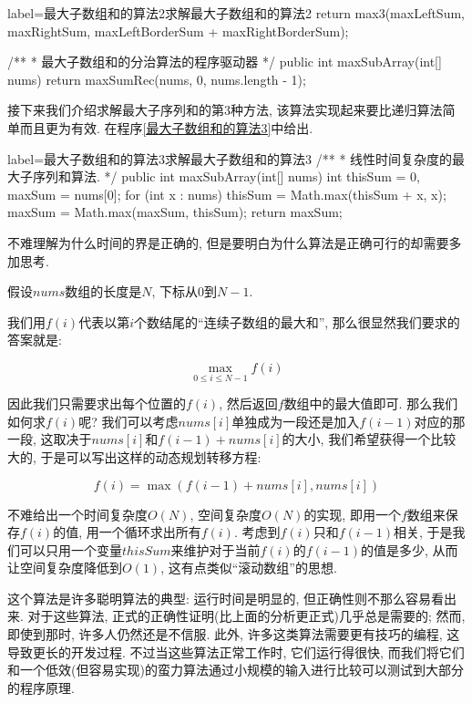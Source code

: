 \documentclass[oneside]{ctexbook}
\begin{document}
{\begin{myjava}{label={最大子数组和的算法2}}{求解最大子数组和的算法2}
{    return max3(maxLeftSum, maxRightSum,
                maxLeftBorderSum + maxRightBorderSum);
}

/**
 * 最大子数组和的分治算法的程序驱动器
 */
public int maxSubArray(int[] nums) {
    return maxSumRec(nums, 0, nums.length - 1);
}
\end{myjava}

接下来我们介绍求解最大子序列和的第3种方法, 该算法实现起来要比递归算法简单而且更为有效. 在程序\ref{最大子数组和的算法3}中给出.

\begin{myjava}{label={最大子数组和的算法3}}{求解最大子数组和的算法3}
/**
 * 线性时间复杂度的最大子序列和算法.
 */
public int maxSubArray(int[] nums) {
    int thisSum = 0, maxSum = nums[0];
    for (int x : nums) {
        thisSum = Math.max(thisSum + x, x);
        maxSum = Math.max(maxSum, thisSum);
    }
    return maxSum;
}
\end{myjava}

不难理解为什么时间的界是正确的, 但是要明白为什么算法是正确可行的却需要多加思考.

假设$nums$数组的长度是$N$, 下标从$0$到$N-1$.

我们用$f(i)$代表以第$i$个数结尾的``连续子数组的最大和'', 那么很显然我们要求的答案就是:

\begin{equation*}
    \max_{0\leq i \leq N-1}{f(i)}
\end{equation*}

因此我们只需要求出每个位置的$f(i)$, 然后返回$f$数组中的最大值即可. 那么我们如何求$f(i)$呢? 我们可以考虑$nums[i]$单独成为一段还是加入$f(i-1)$对应的那一段, 这取决于$nums[i]$和$f(i-1)+nums[i]$的大小, 我们希望获得一个比较大的, 于是可以写出这样的动态规划转移方程:

\begin{equation*}
    f(i) = \max{(f(i-1)+nums[i],nums[i])}
\end{equation*}

不难给出一个时间复杂度$O(N)$, 空间复杂度$O(N)$的实现, 即用一个$f$数组来保存$f(i)$的值, 用一个循环求出所有$f(i)$. 考虑到$f(i)$只和$f(i-1)$相关, 于是我们可以只用一个变量$thisSum$来维护对于当前$f(i)$的$f(i-1)$的值是多少, 从而让空间复杂度降低到$O(1)$, 这有点类似``滚动数组''的思想.

这个算法是许多聪明算法的典型: 运行时间是明显的, 但正确性则不那么容易看出来. 对于这些算法, 正式的正确性证明(比上面的分析更正式)几乎总是需要的; 然而, 即使到那时, 许多人仍然还是不信服. 此外, 许多这类算法需要更有技巧的编程, 这导致更长的开发过程. 不过当这些算法正常工作时, 它们运行得很快, 而我们将它们和一个低效(但容易实现)的蛮力算法通过小规模的输入进行比较可以测试到大部分的程序原理.

}
\end{document}
